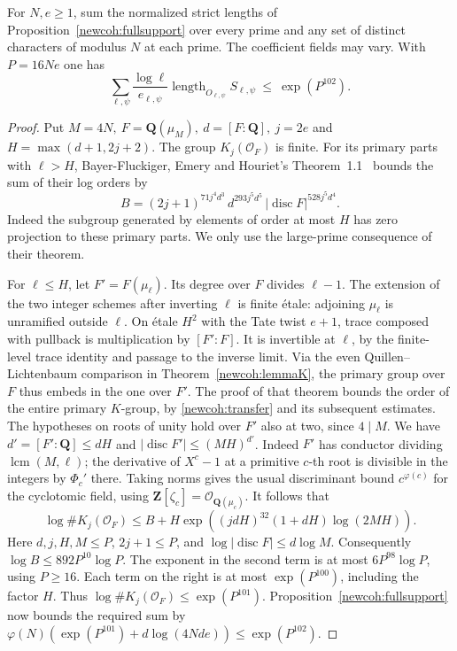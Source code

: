 \begin{theorem}\label{famsel:rate}
For \(N,e\ge1\), sum the normalized strict lengths of
Proposition~\ref{newcoh:fullsupport} over every prime and any set of
distinct characters of modulus \(N\) at each prime. The coefficient
fields may vary. With \(P=16Ne\) one has
\[
 \sum_{\ell,\psi}\frac{\log\ell}{e_{\ell,\psi}}
       \operatorname{length}_{O_{\ell,\psi}}S_{\ell,\psi}
       \ \le\ \exp(P^{102}).
\]
\end{theorem}
\begin{proof}
Put \(M=4N,\ F=\mathbf Q(\mu_M),\ d=[F:\mathbf Q],\ j=2e\)
and \(H=\max(d+1,2j+2)\). The group \(K_j(\mathcal O_F)\) is finite.
For its primary parts with \(\ell>H\), Bayer-Fluckiger, Emery
and Houriet's Theorem~1.1~\cite{bayerEmeryHouriet} bounds the sum of
their log orders by
\[
 B=(2j+1)^{71j^4d^3}\, d^{293j^5d^5}\,
             |\operatorname{disc}F|^{528j^5d^4}.
\]
Indeed the subgroup generated by elements of order at most \(H\)
has zero projection to these primary parts. We only use the
large-prime consequence of their theorem.

For \(\ell\le H\), let \(F'=F(\mu_\ell)\).
Its degree over \(F\) divides \(\ell-1\). The extension of the two
integer schemes after inverting \(\ell\) is finite \'{e}tale:
adjoining \(\mu_\ell\) is unramified outside \(\ell\).
On \'{e}tale \(H^2\) with the Tate twist \(e+1\), trace composed
with pullback is multiplication by \([F':F]\). It is invertible
at \(\ell\), by the finite-level trace identity and passage to the
inverse limit. Via the even Quillen--Lichtenbaum comparison in
Theorem~\ref{newcoh:lemmaK}, the primary group over \(F\) thus embeds
in the one over \(F'\). The proof of that theorem bounds the order of
the entire primary \(K\)-group, by \eqref{newcoh:transfer} and its
subsequent estimates. The hypotheses on roots of unity hold over
\(F'\) also at two, since \(4\mid M\). We have \(d'=[F':\mathbf Q]\le dH\)
and \(|\operatorname{disc}F'|\le(MH)^{d'}\).
Indeed \(F'\) has conductor dividing \(\operatorname{lcm}(M,\ell)\);
the derivative of \(X^c-1\) at a primitive \(c\)-th root is divisible
in the integers by \(\Phi_c'\) there. Taking norms gives the usual
discriminant bound \(c^{\varphi(c)}\) for the cyclotomic field,
using \(\mathbf Z[\zeta_c]=\mathcal O_{\mathbf Q(\mu_c)}\).
It follows that
\[
 \log\#K_j(\mathcal O_F)
 \le B+H\exp\!\left((jdH)^{32}(1+dH)\log(2MH)\right).
\]
Here \(d,j,H,M\le P\), \(2j+1\le P\), and
\(\log|\operatorname{disc}F|\le d\log M\). Consequently
\(\log B\le 892 P^{10}\log P\). The exponent in the second term
is at most \(6P^{98}\log P\), using \(P\ge16\).
Each term on the right is at most \(\exp(P^{100})\), including
the factor \(H\). Thus \(\log\#K_j(\mathcal O_F)\le\exp(P^{101})\).
Proposition~\ref{newcoh:fullsupport} now bounds the required sum by
\(\varphi(N)(\exp(P^{101})+d\log(4Nde))\le\exp(P^{102})\).
\end{proof}

